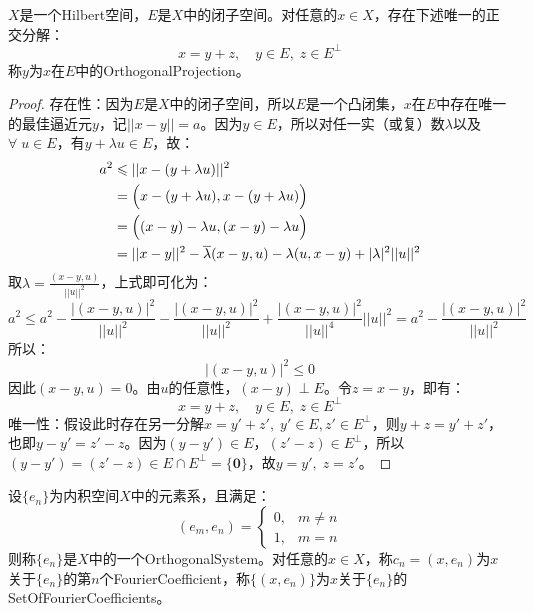 \begin{theorem}
	$X$是一个Hilbert空间，$E$是$X$中的闭子空间。对任意的$x\in X$，存在下述唯一的正交分解：
	\begin{equation*}
		x=y+z,\quad y\in E,\;z\in E^{\perp}
	\end{equation*}
	称$y$为$x$在$E$中的\gls{OrthogonalProjection}。
\end{theorem}
\begin{proof}
	存在性：因为$E$是$X$中的闭子空间，所以$E$是一个凸闭集，$x$在$E$中存在唯一的最佳逼近元$y$，记$||x-y||=a$。因为$y\in E$，所以对任一实（或复）数$\lambda$以及$\forall\;u\in E$，有$y+\lambda u\in E$，故：
	\begin{align*}
		a^2
		&\leqslant||x-(y+\lambda u)||^2 \\
		&=\Bigl(x-(y+\lambda u),x-(y+\lambda u)\Bigr) \\
		&=\Bigl((x-y)-\lambda u,(x-y)-\lambda u\Bigr) \\
		&=||x-y||^2-\overline{\lambda}(x-y,u)-\lambda(u,x-y)+|\lambda|^2||u||^2
	\end{align*}
	取$\lambda=\frac{(x-y,u)}{||u||^2}$，上式即可化为：
	\begin{equation*}
		a^2\leqslant a^2-\frac{|(x-y,u)|^2}{||u||^2}-\frac{|(x-y,u)|^2}{||u||^2}+\frac{|(x-y,u)|^2}{||u||^4}||u||^2=a^2-\frac{|(x-y,u)|^2}{||u||^2}
	\end{equation*}
	所以：
	\begin{equation*}
		|(x-y,u)|^2\leqslant0
	\end{equation*}
	因此$(x-y,u)=0$。由$u$的任意性，$(x-y)\perp E$。令$z=x-y$，即有：
	\begin{equation*}
		x=y+z,\quad y\in E,\;z\in E^{\perp}
	\end{equation*}
	\hspace{3em}唯一性：假设此时存在另一分解$x=y'+z',\;y'\in E,z'\in E^{\perp}$，则$y+z=y'+z'$，也即$y-y'=z'-z$。因为$(y-y')\in E$，$(z'-z)\in E^{\perp}$，所以$(y-y')=(z'-z)\in E\cap E^{\perp}=\{\mathbf{0}\}$，故$y=y',\;z=z'$。
\end{proof}
\begin{definition}
	设$\{e_n\}$为内积空间$X$中的元素系，且满足：
	\begin{equation*}
		(e_m,e_n)=
		\begin{cases}
			0,&m\ne n \\
			1,&m=n
		\end{cases}
	\end{equation*}
	则称$\{e_n\}$是$X$中的一个\gls{OrthogonalSystem}。对任意的$x\in X$，称$c_n=(x,e_n)$为$x$关于$\{e_n\}$的第$n$个\gls{FourierCoefficient}，称$\{(x,e_n)\}$为$x$关于$\{e_n\}$的\gls{SetOfFourierCoefficients}。
\end{definition}

